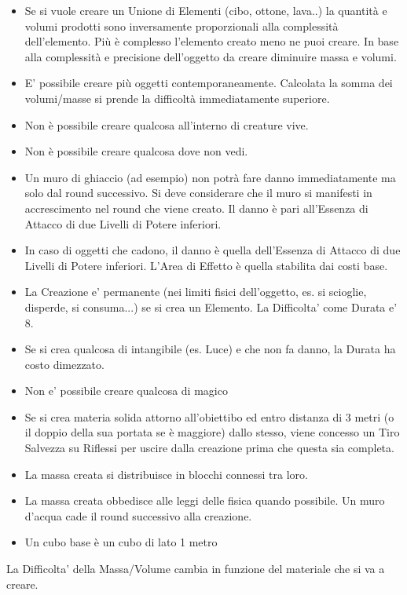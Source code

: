 \documentclass[a4paper,11pt,twoside,openany]{book}
\begin{document}
\begin{itemize}
	\item Se si vuole creare un Unione di Elementi (cibo, ottone, lava..) la quantità e volumi prodotti sono inversamente proporzionali alla complessità dell'elemento. Più è complesso l'elemento creato meno ne puoi creare. In base alla complessità e precisione dell'oggetto da creare diminuire massa e volumi.
	\item E' possibile creare più oggetti contemporaneamente. Calcolata la somma dei volumi/masse si prende la difficoltà immediatamente superiore.
	\item Non è possibile creare qualcosa all'interno di creature vive.
	\item Non è possibile creare qualcosa dove non vedi.
	\item Un muro di ghiaccio (ad esempio) non potrà fare danno immediatamente ma solo dal round successivo. Si deve considerare che il muro si manifesti in accrescimento nel round che viene creato. Il danno è pari all'Essenza di Attacco di due Livelli di Potere inferiori.
	\item In caso di oggetti che cadono, il danno è quella dell'Essenza di Attacco di due Livelli di Potere inferiori. L'Area di Effetto è quella stabilita dai costi base.
    \item La Creazione e' permanente (nei limiti fisici dell'oggetto, es. si scioglie, disperde, si consuma...) se si crea un Elemento. La Difficolta' come Durata e' 8.
	\item Se si crea qualcosa di intangibile (es. Luce) e che non fa danno, la Durata ha costo dimezzato.
	\item Non e' possibile creare qualcosa di magico
	\item Se si crea materia solida attorno all'obiettibo ed entro distanza di 3 metri (o il doppio della sua portata se è maggiore) dallo stesso, viene concesso un Tiro Salvezza su Riflessi per uscire dalla creazione prima che questa sia completa.
	\item La massa creata si distribuisce in blocchi connessi tra loro.
	\item La massa creata obbedisce alle leggi delle fisica quando possibile. Un muro d'acqua cade il round successivo alla creazione.
	\item Un cubo base è un cubo di lato 1 metro
\end{itemize}

\bigskip


La Difficolta' della Massa/Volume cambia in funzione del materiale che si va a creare.
\end{document}
